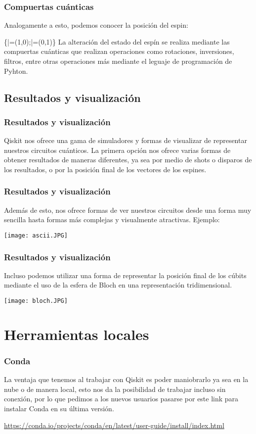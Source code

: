 \documentclass[spanish]{beamer}
\begin{document}
\newpage\justify
\begin{frame}
\frametitle{Compuertas cuánticas}

Analogamente a esto, podemos conocer la posición del espin:

\centering\displaystyle \left\{|\uparrow \rangle =(1,0);|\downarrow \rangle =(0,1)\right\}
\justify
La alteración del estado del espín se realiza mediante las compuertas cuánticas que realizan operaciones como rotaciones, inversiones, filtros, entre otras operaciones más mediante el leguaje de programación de Pyhton.
\end{frame}

\newpage\justify
\begin{frame}\subsection{Resultados y visualización}
\frametitle{Resultados y visualización}
Qiskit nos ofrece una gama de simuladores y formas de visualizar de representar nuestros circuitos cuánticos. La primera opción nos ofrece varias formas de obtener resultados de maneras diferentes, ya sea por medio de shots o disparos de los resultados, o por la posición final de los vectores de los espines.
\end{frame}

\newpage\justify
\begin{frame}
\frametitle{Resultados y visualización}
Además de esto, nos ofrece formas de ver nuestros circuitos desde una forma muy sencilla hasta formas más complejas y visualmente atractivas. Ejemplo:

\centering\texttt{[image: ascii.JPG]}
\end{frame}

\newpage\justify
\begin{frame}
\frametitle{Resultados y visualización}
Incluso podemos utilizar una forma de representar la posición final de los cúbits mediante el uso de la esfera de Bloch en una representación tridimensional.

\centering\texttt{[image: bloch.JPG]}
\end{frame}
\section{Herramientas locales}        
 \setlength{\parskip}{1mm}
 \begin{frame}[fragile]
 \frametitle{Conda} 
 \justify 
La ventaja que tenemos al trabajar con Qiskit es poder maniobrarlo ya sea en la nube o de manera local, esto nos da la posibilidad de trabajar incluso sin conexión, por lo que pedimos a los nuevos usuarios pasarse por este link para instalar Conda en su última versión.
 
\url{https://conda.io/projects/conda/en/latest/user-guide/install/index.html} 
\end{frame}
\end{document}
